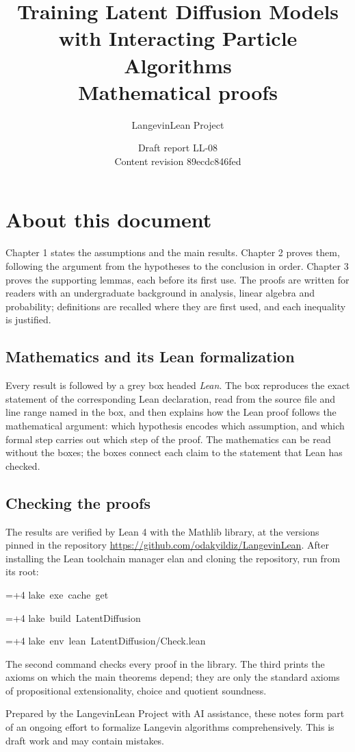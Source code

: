 \documentclass[11pt,a4paper]{report}
\title{\texorpdfstring{Training Latent Diffusion Models with Interacting Particle Algorithms}{Training Latent Diffusion Models with Interacting Particle Algorithms}\\[0.6em]\large Mathematical proofs}
\author{LangevinLean Project}
\date{Draft report LL-08\\[0.4em]\small Content revision 89ecdc846fed}
\newlength{\leancharwidth}
\newenvironment{leancode}{\par\smallskip\begingroup\ttfamily\footnotesize\raggedright
  \settowidth{\leancharwidth}{M}\setlength{\parskip}{0pt}\setlength{\parindent}{0pt}
  \frenchspacing}{\par\endgroup\smallskip}
\newcommand{\leanline}[2]{\hangindent=\dimexpr#1\leancharwidth+4\leancharwidth\relax
  \hangafter=1\noindent\hspace*{#1\leancharwidth}#2\par}
\begin{document}
\maketitle
\chapter*{About this document}
Chapter 1 states the assumptions and the main results. Chapter 2 proves them, following the argument from the hypotheses to the conclusion in order. Chapter 3 proves the supporting lemmas, each before its first use. The proofs are written for readers with an undergraduate background in analysis, linear algebra and probability; definitions are recalled where they are first used, and each inequality is justified.

\section*{Mathematics and its Lean formalization}
Every result is followed by a grey box headed \emph{Lean}. The box reproduces the exact statement of the corresponding Lean declaration, read from the source file and line range named in the box, and then explains how the Lean proof follows the mathematical argument: which hypothesis encodes which assumption, and which formal step carries out which step of the proof. The mathematics can be read without the boxes; the boxes connect each claim to the statement that Lean has checked.

\section*{Checking the proofs}
The results are verified by Lean 4 with the Mathlib library, at the versions pinned in the repository \url{https://github.com/odakyildiz/LangevinLean}. After installing the Lean toolchain manager elan and cloning the repository, run from its root:
\begin{leancode}
\leanline{0}{lake\ exe\ cache\ get}
\leanline{0}{lake\ build\ LatentDiffusion}
\leanline{0}{lake\ env\ lean\ LatentDiffusion/Check.lean}
\end{leancode}
The second command checks every proof in the library. The third prints the axioms on which the main theorems depend; they are only the standard axioms of propositional extensionality, choice and quotient soundness.

Prepared by the LangevinLean Project with AI assistance, these notes form part of an ongoing effort to formalize Langevin algorithms comprehensively. This is draft work and may contain mistakes.
\end{document}

